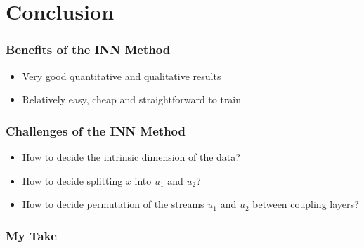 \documentclass[aspectratio=43]{beamer}
\begin{document}
\section{Conclusion}


\begin{frame}
	\frametitle{Benefits of the INN Method}
	\begin{itemize}
		\item Very good quantitative and qualitative results
		\item Relatively easy, cheap and straightforward to train
	\end{itemize}

\end{frame}


\begin{frame}
	\frametitle{Challenges of the INN Method}

	\begin{itemize}
		\item How to decide the intrinsic dimension of the data?
		\item How to decide splitting $x$ into $u_1$ and $u_2$?
		\item How to decide permutation of the streams $u_1$ and $u_2$ between coupling layers?
	\end{itemize}
\end{frame}

\begin{frame}
	\frametitle{My Take}
	\begin{center}
	\end{center}

\end{frame}


\appendix
\end{document}

